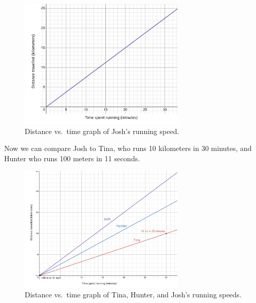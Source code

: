 \documentclass{article}
\begin{document}
\begin{figure}[hbt!]
    \centering
    \includegraphics[width=0.7\textwidth]{justjosh}
    \caption{Distance vs.\ time graph of Josh's running speed.}
\end{figure}
\FloatBarrier

Now we can compare Josh to Tina, who runs 10 kilometers in 30 minutes, and
Hunter who runs 100 meters in 11 seconds. \\

\begin{figure}[hbt!]
    \centering
    \includegraphics[width=0.7\textwidth]{allrunners}
    \caption{Distance vs.\ time graph of Tina, Hunter, and Josh's running speeds.}
\end{figure}
\FloatBarrier
\end{document}
